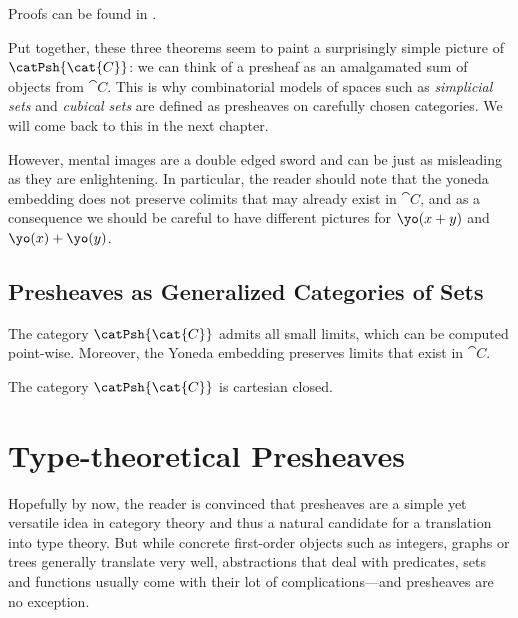 Proofs can be found in .

Put together, these three theorems seem to paint a surprisingly simple picture 
of \( \catPsh{\cat{C}} \): we can think of a presheaf as an amalgamated sum of 
objects from \( \cat{C} \).
% 
This is why combinatorial models of spaces such as \emph{simplicial sets} and 
\emph{cubical sets} are defined as presheaves on carefully chosen categories. 
We will come back to this in the next chapter.

However, mental images are a double edged sword and can be just as misleading
as they are enlightening. In particular, the reader should note that the yoneda 
embedding does not preserve colimits that may already exist in \( \cat{C} \),
and as a consequence we should be careful to have different pictures for
\( \yo(x+y) \) and \( \yo(x) + \yo(y) \).

\subsection{Presheaves as Generalized Categories of Sets}

\begin{theorem}
    The category \( \catPsh{\cat{C}} \) admits all small limits, which can
    be computed point-wise. Moreover, the Yoneda embedding preserves
    limits that exist in \( \cat{C} \).
\end{theorem}

\begin{theorem}
    The category \( \catPsh{\cat{C}} \) is cartesian closed.
\end{theorem}



\section{Type-theoretical Presheaves}\label{sec:intensional-problems}

Hopefully by now, the reader is convinced that presheaves are a simple yet 
versatile idea in category theory and thus a natural candidate for a 
translation into type theory.
% 
But while concrete first-order objects such as integers, graphs or trees 
generally translate very well, abstractions that deal with predicates, sets
and functions usually come with their lot of complications---and presheaves
are no exception.

